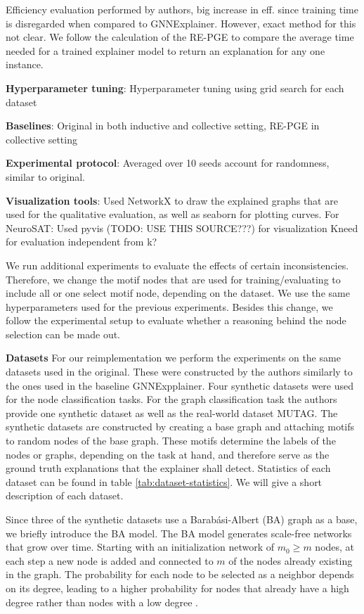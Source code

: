 Efficiency evaluation performed by authors, big increase in eff. since training time is disregarded when compared to GNNExplainer. However, exact method for this not clear. We follow the calculation of the RE-PGE to compare the average time needed for a trained explainer model to return an explanation for any one instance.

\textbf{Hyperparameter tuning}: Hyperparameter tuning using grid search for each dataset

\textbf{Baselines}: Original in both inductive and collective setting, RE-PGE in collective setting

\textbf{Experimental protocol}: Averaged over 10 seeds account for randomness, similar to original.

\textbf{Visualization tools}: Used NetworkX \cite{SciPyProceedings_11} to draw the explained graphs that are used for the qualitative evaluation, as well as seaborn \cite{Waskom2021} for plotting curves.
For NeuroSAT: Used pyvis \cite{perrone2020network} (TODO: USE THIS SOURCE???) for visualization
Kneed for evaluation independent from k?


We run additional experiments to evaluate the effects of certain inconsistencies. Therefore, we change the motif nodes that are used for training/evaluating to include all or one select motif node, depending on the dataset. We use the same hyperparameters used for the previous experiments. Besides this change, we follow the experimental setup to evaluate whether a reasoning behind the node selection can be made out.


\textbf{Datasets}
For our reimplementation we perform the experiments on the same datasets used in the original. These were constructed by the authors similarly to the ones used in the baseline GNNExpplainer. Four synthetic datasets were used for the node classification tasks. For the graph classification task the authors provide one synthetic dataset as well as the real-world dataset MUTAG. The synthetic datasets are constructed by creating a base graph and attaching motifs to random nodes of the base graph. These motifs determine the labels of the nodes or graphs, depending on the task at hand, and therefore serve as the ground truth explanations that the explainer shall detect. Statistics of each dataset can be found in table \ref{tab:dataset-statistics}. We will give a short description of each dataset.

Since three of the synthetic datasets use a Barabási-Albert (BA) graph as a base, we briefly introduce the BA model. The BA model generates scale-free networks that grow over time. Starting with an initialization network of $m_0 \geq m$ nodes, at each step a new node is added and connected to $m$ of the nodes already existing in the graph. The probability for each node to be selected as a neighbor depends on its degree, leading to a higher probability for nodes that already have a high degree rather than nodes with a low degree \cite{albert2002statistical}.

